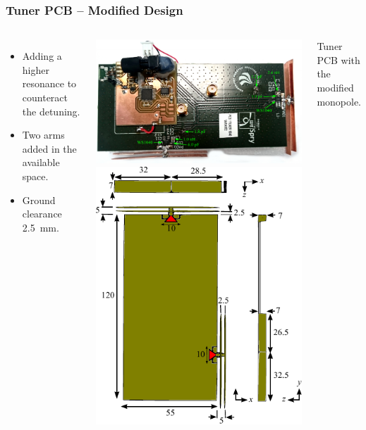 \begin{frame}[fragile]
    \frametitle{Tuner PCB -- Modified Design}
    \begin{columns}[onlytextwidth,t]
          \begin{itemize}
          \item Adding a higher resonance to counteract the detuning.
          \item Two arms added in the available space. 
          \item Ground clearance \SI{2.5}{mm}.
          \end{itemize}
        \begin{center}
            \includegraphics[scale=0.33, angle =90]{img/Lasse/lassedouble.pdf}
            \includegraphics[scale=0.53]{img/Lasse/3d_drawing_modi.pdf}
        \end{center}
        Tuner PCB with the modified monopole.
    \end{columns}
\end{frame}
\def\legendfooter{\scriptsize{Upper: Top antenna. Lower: Side antenna. \textcolor{bb}{Monopole Sim}, \textcolor{gg}{Monopole Meas}, Frequency in MHz.}}
\def\emptyline{\textcolor{white}{Empty}}

